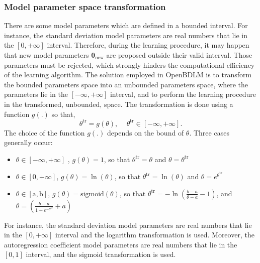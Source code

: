 \subsubsection{Model parameter space transformation}
\label{SS:THSpaceTransformation}

There are some model parameters which are defined in a bounded interval.
For instance, the standard deviation model parameters are real numbers that lie in the $[0, +\infty]$ interval.
Therefore, during the learning procedure, it may happen that new model parameters $\bm\theta_{\text{new}}$ are proposed outside their valid interval.
Those parameters must be rejected, which strongly hinders the computational efficiency of the learning algorithm.
The solution employed in OpenBDLM is to transform the bounded parameters space into an unbounded parameters space, where the parameters lie in the $[ -\infty, +\infty ]$ interval, and to perform the learning procedure in the transformed, unbounded, space.
The transformation is done using a function $g(.)$ so that, 
\begin{equation}
\theta^{\text{tr}} = g(\theta) \text{, }\quad \theta^{\text{tr}} \in [-\infty, +\infty ] \text{.}
\end{equation}
The choice of the function $g(.)$ depends on the bound of $\theta$. 
Three cases generally occur:
\begin{itemize}
\item $ \theta \in [-\infty, +\infty ]$ , $g(\theta) = 1$, so that $\theta^{\text{tr}} = \theta$ and $\theta = \theta^{\text{tr}} $
\item $ \theta \in [0, +\infty ]$, $g(\theta) = \ln(\theta)$, so that $\theta^{\text{tr}} = \ln(\theta) $ and $\theta = e^{\theta^{\text{tr}}} $
\item $ \theta \in [\text{a}, \text{b}]$, $g(\theta) = \text{sigmoid}(\theta)$, so that $\theta^{\text{tr}} = -\ln \left( \frac{b-a}{\theta-a} - 1\right) $, and $\theta = \left( \frac{b-a}{1+e^{-\theta^{\text{tr}}}} + a \right)$
\end{itemize}
For instance, the standard deviation model parameters are real numbers that lie in the $[0, +\infty]$ interval and the logarithm transformation is used.
Moreover, the autoregression coefficient model parameters are real numbers that lie in the $[0, 1]$ interval, and the sigmoid transformation is used.

